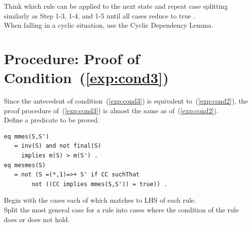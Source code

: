 \documentclass[12pt]{report}
\begin{document}
 Think which rule can be applied to the next
state and repeat case splitting similarly as Step 1-3, 1-4, and 1-5
until all cases reduce to true . \\

 When falling in a cyclic situation, use the
Cyclic Dependency Lemma.

\section{Procedure: Proof of Condition~(\ref{exp:cond3})}
\label{sec:mesmes}
Since the antecedent of condition~(\ref{exp:cond3}) is equivalent to~(\ref{exp:cond2}), the
proof procedure of~(\ref{exp:cond3}) is almost the same as of~(\ref{exp:cond2}). \\

 Define a predicate to be proved.
\begin{verbatim}
eq mmes(S,S')
   = inv(S) and not final(S)
     implies m(S) > m(S') .
eq mesmes(S)
   = not (S =(*,1)=>+ S' if CC suchThat
        not ((CC implies mmes(S,S')) = true)) .
\end{verbatim}

 Begin with the cases each of which matches to
LHS of each rule. \\

 Split the most general case for a rule into
cases where the condition of the rule does or does not hold. 

\end{document}
